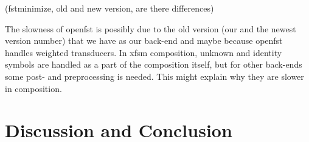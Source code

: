\documentclass{llncs}
\begin{document}
(fstminimize, old and new version, are there differences)

The slowness of openfst is possibly due to the old version (our and the newest 
version number) that we have as our
back-end and maybe because openfst handles weighted transducers. In xfsm
composition, unknown and identity symbols are handled as a part of the 
composition itself, but for other back-ends some post- and preprocessing is
needed. This might explain why they are slower in composition.

\section{Discussion and Conclusion}\label{sec:discussion}



\end{document}
